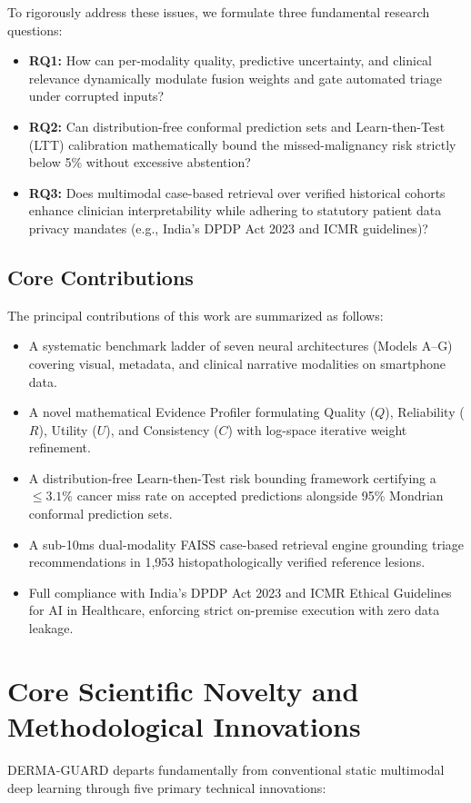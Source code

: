 \documentclass[conference]{IEEEtran}
\begin{document}
To rigorously address these issues, we formulate three fundamental research questions:
\begin{itemize}
    \item \textbf{RQ1:} How can per-modality quality, predictive uncertainty, and clinical relevance dynamically modulate fusion weights and gate automated triage under corrupted inputs?
    \item \textbf{RQ2:} Can distribution-free conformal prediction sets and Learn-then-Test (LTT) calibration mathematically bound the missed-malignancy risk strictly below 5\% without excessive abstention?
    \item \textbf{RQ3:} Does multimodal case-based retrieval over verified historical cohorts enhance clinician interpretability while adhering to statutory patient data privacy mandates (e.g., India's DPDP Act 2023 and ICMR guidelines)?
\end{itemize}

\subsection{Core Contributions}
The principal contributions of this work are summarized as follows:
\begin{itemize}
    \item A systematic benchmark ladder of seven neural architectures (Models A--G) covering visual, metadata, and clinical narrative modalities on smartphone data.
    \item A novel mathematical Evidence Profiler formulating Quality ($Q$), Reliability ($R$), Utility ($U$), and Consistency ($C$) with log-space iterative weight refinement.
    \item A distribution-free Learn-then-Test risk bounding framework certifying a $\le 3.1\%$ cancer miss rate on accepted predictions alongside 95\% Mondrian conformal prediction sets.
    \item A sub-10ms dual-modality FAISS case-based retrieval engine grounding triage recommendations in 1,953 histopathologically verified reference lesions.
    \item Full compliance with India's DPDP Act 2023 and ICMR Ethical Guidelines for AI in Healthcare, enforcing strict on-premise execution with zero data leakage.
\end{itemize}

\section{Core Scientific Novelty and Methodological Innovations}
DERMA-GUARD departs fundamentally from conventional static multimodal deep learning through five primary technical innovations:
\end{document}

